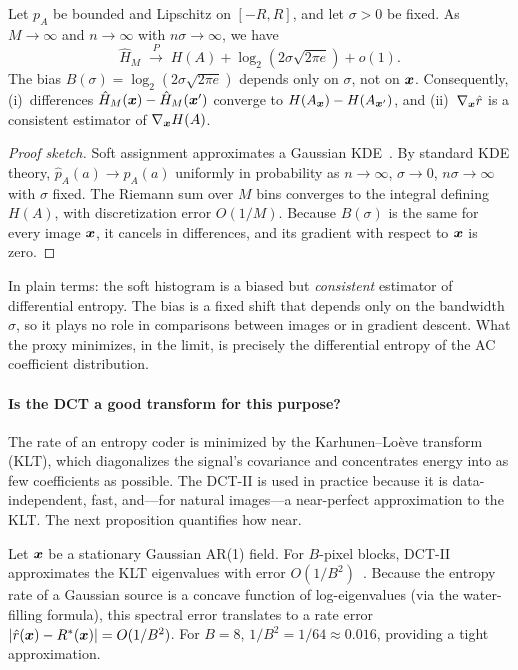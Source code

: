 \begin{proposition}
\label{prop:convergence}
Let $p_A$ be bounded and Lipschitz on $[-R,R]$, and let $\sigma>0$ be fixed.
As $M\to\infty$ and $n\to\infty$ with $n\sigma\to\infty$, we have
\[
  \hat{H}_M \;\xrightarrow{P}\; H(A) + \log_2(2\sigma\sqrt{2\pi e}) + o(1).
\]
The bias $B(\sigma)=\log_2(2\sigma\sqrt{2\pi e})$ depends only on $\sigma$, not on $\boldsymbol{x}$.  Consequently, (i)~differences $\hat{H}_M(\boldsymbol{x})-\hat{H}_M(\boldsymbol{x}^{\prime})$ converge to $H(A_{\boldsymbol{x}})-H(A_{\boldsymbol{x}^{\prime}})$, and (ii)~$\nabla_{\boldsymbol{x}}\hat{r}$ is a consistent estimator of $\nabla_{\boldsymbol{x}}H(A)$.
\end{proposition}

\begin{proof}[Proof sketch]
Soft assignment approximates a Gaussian KDE~\citep{parzen1962estimation}.
By standard KDE theory, $\hat{p}_A(a)\to p_A(a)$ uniformly in probability as $n\to\infty$, $\sigma\to0$, $n\sigma\to\infty$ with $\sigma$ fixed.
The Riemann sum over $M$ bins converges to the integral defining $H(A)$, with discretization error $O(1/M)$.
Because $B(\sigma)$ is the same for every image $\boldsymbol{x}$, it cancels in differences, and its gradient with respect to $\boldsymbol{x}$ is zero.
\end{proof}

In plain terms: the soft histogram is a biased but \emph{consistent} estimator of differential entropy.
The bias is a fixed shift that depends only on the bandwidth $\sigma$, so it plays no role in comparisons between images or in gradient descent.
What the proxy minimizes, in the limit, is precisely the differential entropy of the AC coefficient distribution.

\paragraph{Is the DCT a good transform for this purpose?}
The rate of an entropy coder is minimized by the Karhunen--Lo\`eve transform (KLT), which diagonalizes the signal's covariance and concentrates energy into as few coefficients as possible.
The DCT-II is used in practice because it is data-independent, fast, and---for natural images---a near-perfect approximation to the KLT.
The next proposition quantifies how near.

\begin{proposition}
\label{prop:klt}
Let $\boldsymbol{x}$ be a stationary Gaussian AR(1) field.
For $B$-pixel blocks, DCT-II approximates the KLT eigenvalues with error $O(1/B^2)$~\citep{clarke1985transform}.
Because the entropy rate of a Gaussian source is a concave function of log-eigenvalues (via the water-filling formula), this spectral error translates to a rate error $|\hat{r}(\boldsymbol{x}) - R^*(\boldsymbol{x})| = O(1/B^2)$.
For $B=8$, $1/B^2 = 1/64 \approx 0.016$, providing a tight approximation.
\end{proposition}

